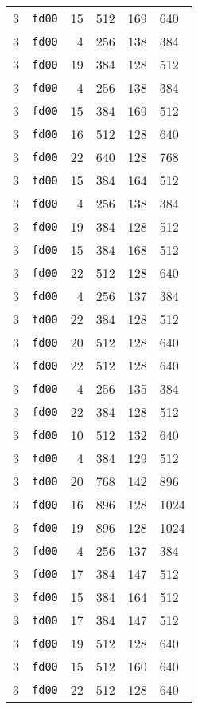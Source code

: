 \documentclass{article}
\begin{document}
\begin{table}[h!]
\begin{tabular}{llrrrl}
    3 & \texttt{fd00} & 15 & 512 & 169 & 640 \\
    3 & \texttt{fd00} & 4 & 256 & 138 & 384 \\
    3 & \texttt{fd00} & 19 & 384 & 128 & 512 \\
    3 & \texttt{fd00} & 4 & 256 & 138 & 384 \\
    3 & \texttt{fd00} & 15 & 384 & 169 & 512 \\
    3 & \texttt{fd00} & 16 & 512 & 128 & 640 \\
    3 & \texttt{fd00} & 22 & 640 & 128 & 768 \\
    3 & \texttt{fd00} & 15 & 384 & 164 & 512 \\
    3 & \texttt{fd00} & 4 & 256 & 138 & 384 \\
    3 & \texttt{fd00} & 19 & 384 & 128 & 512 \\
    3 & \texttt{fd00} & 15 & 384 & 168 & 512 \\
    3 & \texttt{fd00} & 22 & 512 & 128 & 640 \\
    3 & \texttt{fd00} & 4 & 256 & 137 & 384 \\
    3 & \texttt{fd00} & 22 & 384 & 128 & 512 \\
    3 & \texttt{fd00} & 20 & 512 & 128 & 640 \\
    3 & \texttt{fd00} & 22 & 512 & 128 & 640 \\
    3 & \texttt{fd00} & 4 & 256 & 135 & 384 \\
    3 & \texttt{fd00} & 22 & 384 & 128 & 512 \\
    3 & \texttt{fd00} & 10 & 512 & 132 & 640 \\
    3 & \texttt{fd00} & 4 & 384 & 129 & 512 \\
    3 & \texttt{fd00} & 20 & 768 & 142 & 896 \\
    3 & \texttt{fd00} & 16 & 896 & 128 & 1024 \\
    3 & \texttt{fd00} & 19 & 896 & 128 & 1024 \\
    3 & \texttt{fd00} & 4 & 256 & 137 & 384 \\
    3 & \texttt{fd00} & 17 & 384 & 147 & 512 \\
    3 & \texttt{fd00} & 15 & 384 & 164 & 512 \\
    3 & \texttt{fd00} & 17 & 384 & 147 & 512 \\
    3 & \texttt{fd00} & 19 & 512 & 128 & 640 \\
    3 & \texttt{fd00} & 15 & 512 & 160 & 640 \\
    3 & \texttt{fd00} & 22 & 512 & 128 & 640 \\

\end{tabular}
\end{table}
\end{document}
